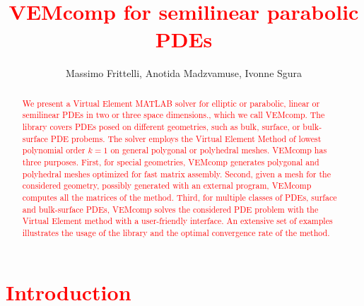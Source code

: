 \documentclass[a4paper]{article}
\newcommand{\red}[1]{\textcolor{red}{#1}}
\begin{document}
 
\title{\red{VEMcomp for semilinear parabolic PDEs}}
\author{Massimo Frittelli, Anotida Madzvamuse, Ivonne Sgura}

\maketitle

\begin{abstract}
\red{We present a Virtual Element MATLAB solver for elliptic or parabolic, linear or semilinear PDEs in two or three space dimensions., which we call VEMcomp. The library covers PDEs posed on different geometries, such as bulk, surface, or bulk-surface PDE probems. The solver employs the Virtual Element Method of lowest polynomial order $k=1$ on general polygonal or polyhedral meshes.  VEMcomp has three purposes.
First,  for special geometries,  VEMcomp generates polygonal and polyhedral meshes optimized for fast matrix assembly. Second, given a mesh for the considered geometry, possibly generated with an external program, VEMcomp computes all the matrices of the method.
Third, for multiple classes of PDEs, surface and bulk-surface PDEs,  VEMcomp solves the considered PDE problem with the Virtual Element method with a user-friendly interface.  An extensive set of examples illustrates the usage of the library and the optimal convergence rate of the method.}
\end{abstract}

\section{\red{Introduction}}
\end{document}
